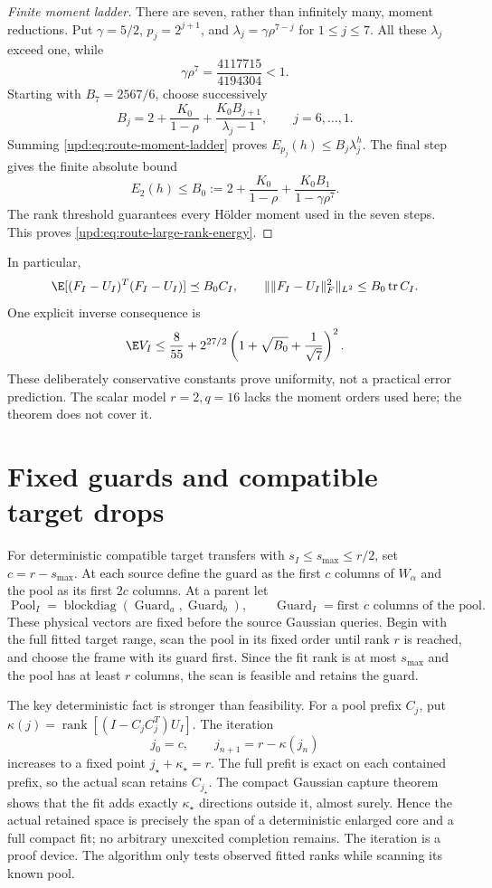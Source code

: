 \documentclass[11pt,oneside,openany,a4paper]{book}
\numberwithin{equation}{chapter}
\theoremstyle{definition}
\theoremstyle{remark}
\DeclareMathOperator{\tr}{tr}\DeclareMathOperator{\rank}{rank}
\DeclareMathOperator{\diag}{blockdiag}\DeclareMathOperator{\range}{range}
\begin{document}
\begin{proof}[Finite moment ladder]
There are seven, rather than infinitely many, moment reductions.  Put
$\gamma=5/2$, $p_j=2^{j+1}$, and
$\lambda_j=\gamma\rho^{7-j}$ for $1\leq j\leq7$.
All these $\lambda_j$ exceed one, while
\[
 \gamma\rho^7=\frac{4117715}{4194304}<1.
\]
Starting with $B_7=2567/6$, choose successively
\[
 B_j=2+\frac{K_0}{1-\rho}
       +\frac{K_0B_{j+1}}{\lambda_j-1},
 \qquad j=6,\ldots,1.
\]
Summing \eqref{upd:eq:route-moment-ladder} proves
$E_{p_j}(h)\leq B_j\lambda_j^h$.  The final step gives the finite
absolute bound
\[
 E_2(h)\leq B_0:=2+\frac{K_0}{1-\rho}
             +\frac{K_0B_1}{1-\gamma\rho^7}.
\]
The rank threshold guarantees every Hölder moment used in the seven
steps.  This proves \eqref{upd:eq:route-large-rank-energy}.
\end{proof}

In particular,
\[
 \E[(F_I-U_I)^T(F_I-U_I)]\preceq B_0C_I,
 \qquad
 \|\lVert F_I-U_I\rVert_F^2\|_{L^2}\leq B_0\tr C_I.
\]
One explicit inverse consequence is
\[
 \E V_I\leq\frac8{55}
 +2^{27/2}\left(1+\sqrt{B_0}+\frac1{\sqrt7}\right)^2.
\]
These deliberately conservative constants prove uniformity, not a
practical error prediction.  The scalar model $r=2,q=16$ lacks the
moment orders used here; the theorem does not cover it.

\section{Fixed guards and compatible target drops}

For deterministic compatible target transfers with
$s_I\leq s_{\max}\leq r/2$, set $c=r-s_{\max}$.  At each source define
the guard as the first $c$ columns of $W_\alpha$ and the pool as its
first $2c$ columns.  At a parent let
\[
 \operatorname{Pool}_I=\diag(\operatorname{Guard}_a,
                             \operatorname{Guard}_b),
 \qquad
 \operatorname{Guard}_I=\text{first $c$ columns of the pool}.
\]
These physical vectors are fixed before the source Gaussian queries.
Begin with the full fitted target range, scan the pool in its fixed
order until rank $r$ is reached, and choose the frame with its guard
first.  Since the fit rank is at most $s_{\max}$ and the pool has at
least $r$ columns, the scan is feasible and retains the guard.

The key deterministic fact is stronger than feasibility.  For a pool
prefix $C_j$, put
$\kappa(j)=\rank[(I-C_jC_j^T)U_I]$.  The iteration
\[
 j_0=c,\qquad j_{n+1}=r-\kappa(j_n)
\]
increases to a fixed point $j_\star+\kappa_\star=r$.
The full prefit is exact on each contained prefix, so the actual scan
retains $C_{j_\star}$.  The compact Gaussian capture theorem shows that
the fit adds exactly $\kappa_\star$ directions outside it, almost
surely.  Hence the actual retained space is precisely the span of a
deterministic enlarged core and a full compact fit; no arbitrary
unexcited completion remains.  The iteration is a proof device.  The
algorithm only tests observed fitted ranks while scanning its known
pool.
\end{document}
